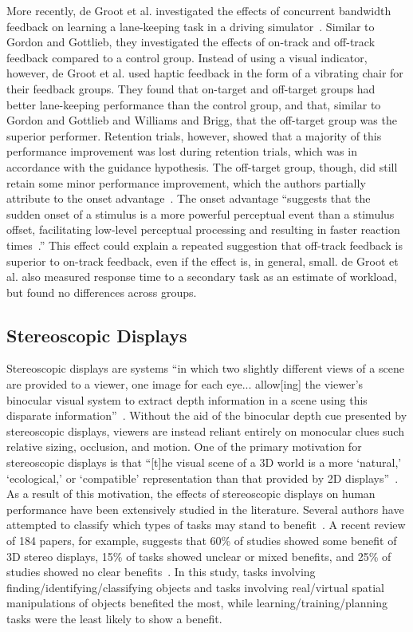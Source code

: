 \documentclass{paper}
\begin{document}
More recently, de Groot et al. investigated the effects of concurrent bandwidth feedback on learning a lane-keeping task in a driving simulator~\cite{DeGroot2011}.
Similar to Gordon and Gottlieb, they investigated the effects of on-track and off-track feedback compared to a control group.
Instead of using a visual indicator, however, de Groot et al. used haptic feedback in the form of a vibrating chair for their feedback groups.
They found that on-target and off-target groups had better lane-keeping performance than the control group, and that, similar to Gordon and Gottlieb and Williams and Brigg, that the off-target group was the superior performer.
Retention trials, however, showed that a majority of this performance improvement was lost during retention trials, which was in accordance with the guidance hypothesis.
The off-target group, though, did still retain some minor performance improvement, which the authors partially attribute to the onset advantage~\cite{fischer2008differential}.
The onset advantage ``suggests that the sudden onset of a stimulus is a
more powerful perceptual event than a stimulus offset, facilitating low-level perceptual processing and resulting in faster reaction times~\cite{DeGroot2011}.''
This effect could explain a repeated suggestion that off-track feedback is superior to on-track feedback, even if the effect is, in general, small.
de Groot et al. also measured response time to a secondary task as an estimate of workload, but found no differences across groups.

\subsection{Stereoscopic Displays}
Stereoscopic displays are systems ``in which two slightly different views of a scene are provided to a viewer, one image for each eye... allow[ing] the viewer's binocular visual system to extract depth information in a scene using this disparate information''~\cite{McIntire2014}.
Without the aid of the binocular depth cue presented by stereoscopic displays, viewers are instead reliant entirely on monocular clues such relative sizing, occlusion, and motion.
One of the primary motivation for stereoscopic displays is that ``[t]he visual scene of a 3D world is a more `natural,' `ecological,' or `compatible' representation than that provided by 2D displays''~\cite{Wickens1990}.
As a result of this motivation, the effects of stereoscopic displays on human performance have been extensively studied in the literature.
Several authors have attempted to classify which types of tasks may stand to benefit~\cite{McIntire2014, Wickens1990, Wickens1989, Naikar1998, Dixon2009}.
A recent review of 184 papers, for example, suggests that 60\% of studies showed some benefit of 3D stereo displays, 15\% of tasks showed unclear or mixed benefits, and 25\% of studies showed no clear benefits~\cite{McIntire2014}.
In this study, tasks involving finding/identifying/classifying objects and tasks involving real/virtual spatial manipulations of objects benefited the most, while learning/training/planning tasks were the least likely to show a benefit.
\end{document}
